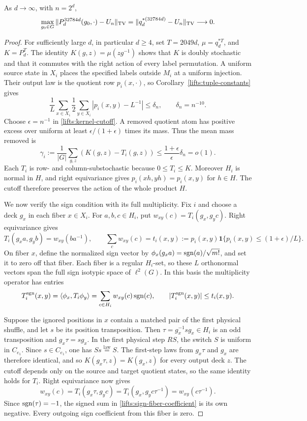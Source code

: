 \begin{theorem}\label{lifts:sixteen-theorem}
As $d\to\infty$, with $n=2^d$,
\[
 \max_{g_0\in G}\|P_d^{32784d}(g_0,\cdot)-U_n\|_{\mathrm{TV}}
 =\|q_d^{*(32784d)}-U_n\|_{\mathrm{TV}}\longrightarrow0.
\]
\end{theorem}
\begin{proof}
For sufficiently large $d$, in particular $d\ge4$, set $T=2049d$,
$\mu=q_d^{*T}$, and $K=P_d^T$.
The identity $K(g,z)=\mu(zg^{-1})$ shows that $K$ is doubly stochastic
and that it commutes with the right action of every label permutation.
A uniform source state in $X_i$ places the specified labels outside
$M_i$ at a uniform injection. Their output law is the quotient row
$p_i(x,\cdot)$, so Corollary~\ref{lifts:tuple-constants} gives
\[
 \frac1L\sum_{x\in X_i}\frac12\sum_{y\in X_i}
       |p_i(x,y)-L^{-1}|\le\delta_n,\qquad \delta_n=n^{-10}.
\]
Choose $\epsilon=n^{-1}$ in \eqref{lifts:kernel-cutoff}. A removed
quotient atom has positive excess over uniform at least
$\epsilon/(1+\epsilon)$ times its mass. Thus the mean mass removed is
\[
 \gamma_i:=\frac1{|G|}\sum_{g,z}(K(g,z)-T_i(g,z))
 \le\frac{1+\epsilon}{\epsilon}\delta_n=o(1).
\]
Each $T_i$ is row- and column-substochastic because $0\le T_i\le K$.
Moreover $H_i$ is normal in $H$, and right equivariance gives
$p_i(xh,yh)=p_i(x,y)$ for $h\in H$. The cutoff therefore preserves
the action of the whole product $H$.

We now verify the sign condition with its full multiplicity.
Fix $i$ and choose a deck $g_x$ in each fiber $x\in X_i$. For
$a,b,c\in H_i$, put $w_{xy}(c)=T_i(g_x,g_yc)$. Right equivariance gives
\[
 T_i(g_xa,g_yb)=w_{xy}(ba^{-1}),\qquad
 \sum_cw_{xy}(c)=t_i(x,y)
 :=p_i(x,y)\mathbf1\{p_i(x,y)\le(1+\epsilon)/L\}.
\]
On fiber $x$, define the normalized sign vector by
$\phi_x(g_xa)=\operatorname{sgn}(a)/\sqrt{m!}$, and set it to zero off that fiber.
Each fiber is a regular $H_i$-set, so these $L$ orthonormal vectors
span the full sign isotypic space of $\ell^2(G)$. In this basis the multiplicity
operator has entries
\begin{equation}
 T_i^{\operatorname{sgn}}(x,y)=\langle\phi_x,T_i\phi_y\rangle
 =\sum_{c\in H_i}w_{xy}(c)\operatorname{sgn}(c),
 \qquad |T_i^{\operatorname{sgn}}(x,y)|\le t_i(x,y).
 \label{lifts:sign-fiber-coefficient}
\end{equation}

Suppose the ignored positions in $x$ contain a matched pair of the
first physical shuffle, and let $s$ be its position transposition.
Then $\tau=g_x^{-1}sg_x\in H_i$ is an odd transposition and
$g_x\tau=sg_x$. In the first physical step $RS$, the switch $S$ is
uniform in $C_{e_1}$. Since $s\in C_{e_1}$, one has
$Ss\stackrel{\mathrm{law}}=S$. The first-step laws from $g_x\tau$
and $g_x$ are therefore identical, and so
$K(g_x\tau,z)=K(g_x,z)$ for every output deck $z$.
The cutoff depends only on the source and target quotient states,
so the same identity holds for $T_i$. Right equivariance now gives
\[
 w_{xy}(c)
 =T_i(g_x\tau,g_yc)
 =T_i(g_x,g_yc\tau^{-1})
 =w_{xy}(c\tau^{-1}).
\]
Since $\operatorname{sgn}(\tau)=-1$, the signed sum in
\eqref{lifts:sign-fiber-coefficient} is its own negative. Every
outgoing sign coefficient from this fiber is zero.


\end{proof}
